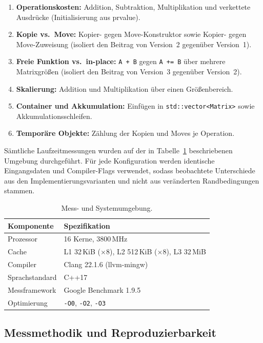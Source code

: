 \documentclass[10pt,a4paper]{article}
\begin{document}
\begin{enumerate}
  \item \textbf{Operationskosten:} Addition, Subtraktion, Multiplikation und
  verkettete Ausdrücke (Initialisierung aus prvalue).
  \item \textbf{Kopie vs.\ Move:} Kopier- gegen Move-Konstruktor sowie Kopier-
  gegen Move-Zuweisung (isoliert den Beitrag von Version~2 gegenüber Version~1).
  \item \textbf{Freie Funktion vs.\ in-place:} \texttt{A + B} gegen
  \texttt{A += B} über mehrere Matrixgrößen (isoliert den Beitrag von
  Version~3 gegenüber Version~2).
  \item \textbf{Skalierung:} Addition und Multiplikation über einen Größenbereich.
  \item \textbf{Container und Akkumulation:} Einfügen in \texttt{std::vector<Matrix>}
  sowie Akkumulationsschleifen.
  \item \textbf{Temporäre Objekte:} Zählung der Kopien und Moves je Operation.
\end{enumerate}

Sämtliche Laufzeitmessungen wurden auf der in Tabelle~\ref{tab:umgebung}
beschriebenen Umgebung durchgeführt. Für jede Konfiguration werden identische
Eingangsdaten und Compiler-Flags verwendet, sodass beobachtete Unterschiede aus
den Implementierungsvarianten und nicht aus veränderten Randbedingungen stammen.

\begin{table}[htbp]
\centering
\caption{Mess- und Systemumgebung.}
\label{tab:umgebung}
\begin{tabular}{ll}
\toprule
\textbf{Komponente} & \textbf{Spezifikation} \\
\midrule
Prozessor    & 16 Kerne, 3800\,MHz \\
Cache        & L1 32\,KiB ($\times 8$), L2 512\,KiB ($\times 8$), L3 32\,MiB \\
Compiler     & Clang 22.1.6 (llvm-mingw) \\
Sprachstandard & C++17 \\
Messframework  & Google Benchmark 1.9.5 \\
Optimierung    & \texttt{-O0}, \texttt{-O2}, \texttt{-O3} \\
\bottomrule
\end{tabular}
\end{table}

\subsection{Messmethodik und Reproduzierbarkeit}
\label{sec:methodik}
\end{document}
